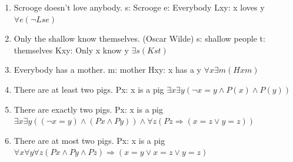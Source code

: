 \documentclass[]{article}
\begin{document}
\begin{enumerate}
    \item Scrooge doesn’t love anybody.
    \newline s: Scrooge
    \newline e: Everybody
    \newline Lxy: x loves y
    \newline $\forall e (\neg Lse)$

    
    \item Only the shallow know themselves. (Oscar Wilde)
    \newline s: shallow people
    \newline t: themselves
    \newline Kxy: Only x know y
    \newline $\exists s (Kst)$
    
    \item Everybody has a mother.
    \newline m: mother
    \newline Hxy: x has a y
    \newline $\forall x \exists m (Hxm)$
    
    \item  There are at least two pigs.
    \newline Px: x is a pig
    \newline $\exists x \exists y (\neg x = y \land P(x)\land P(y))$
    
    \item There are exactly two pigs.
    \newline Px: x is a pig
    \newline $\exists x \exists y((\neg x = y)\land (Px \land Py))\land\forall z (Pz \Rightarrow (x = z \lor y=z))$

    \item There are at most two pigs.
    \newline Px: x is a pig
    \newline $\forall x \forall y \forall z(Px \land Py \land Pz) \Rightarrow (x=y \lor x=z \lor y=z)$
    
\end{enumerate}
\end{document}
